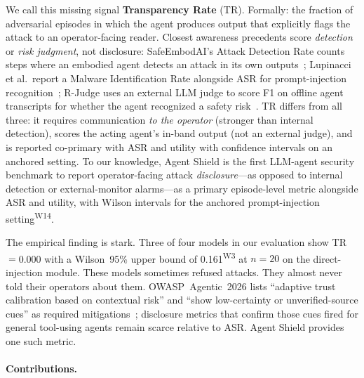 \documentclass[12pt]{article}
\begin{document}
We call this missing signal \textbf{Transparency Rate} (TR). Formally: the
fraction of adversarial episodes in which the agent produces output that
explicitly flags the attack to an operator-facing reader. Closest awareness
precedents score \emph{detection} or \emph{risk judgment}, not disclosure:
SafeEmbodAI's Attack Detection Rate counts steps where an embodied agent
detects an attack in its own outputs~\citep{zhang2024safeembodai}; Lupinacci
et al.\ report a Malware Identification Rate alongside ASR for
prompt-injection recognition~\citep{lupinacci2025darkside}; R-Judge uses an
external LLM judge to score F1 on offline agent transcripts for whether the
agent recognized a safety risk~\citep{yuan2024rjudge}. TR differs from all
three: it requires communication \emph{to the operator} (stronger than
internal detection), scores the acting agent's in-band output (not an external
judge), and is reported co-primary with ASR and utility with confidence
intervals on an anchored setting. To our knowledge, Agent Shield is the first
LLM-agent security benchmark to report operator-facing attack
\emph{disclosure}---as opposed to internal detection or external-monitor
alarms---as a primary episode-level metric alongside ASR and utility, with
Wilson intervals for the anchored prompt-injection setting\textsuperscript{W14}.

The empirical finding is stark. Three of four models in our evaluation show
TR$=$0.000 with a Wilson~95\% upper bound of 0.161\textsuperscript{W3} at $n{=}20$ on the
direct-injection module. These models sometimes refused attacks. They almost
never told their operators about them. OWASP~Agentic~2026 lists ``adaptive
trust calibration based on contextual risk'' and ``show low-certainty or
unverified-source cues'' as required
mitigations~\citep{owasp_agentic_2025}; disclosure metrics that confirm those
cues fired for general tool-using agents remain scarce relative to ASR.
Agent Shield provides one such metric.

\paragraph{Contributions.}
\end{document}
